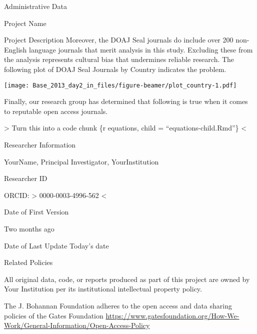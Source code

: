 \documentclass[ignorenonframetext,]{beamer}
\begin{document}
\begin{frame}{Administrative Data}
\begin{block}{Project Name}
\begin{block}{Project Description}
Moreover, the DOAJ Seal journals do include over 200 non-English
language journals that merit analysis in this study. Excluding these
from the analysis represents cultural bias that undermines reliable
research. The following plot of DOAJ Seal Journals by Country indicates
the problem.

\texttt{[image: Base\_2013\_day2\_in\_files/figure-beamer/plot\_country-1.pdf]}

Finally, our research group has determined that following is true when
it comes to reputable open access journals.

\textbar{}\textbar{}\textgreater{} Turn this into a code chunk \{r
equations, child = ``equations-child.Rmd''\}
\textless{}\textbar{}\textbar{}

\end{block}

\begin{block}{Researcher Information}

YourName, Principal Investigator, YourInstitution

Researcher ID

ORCID: \textbar{}\textbar{}\textgreater{} 0000-0003-4996-562
\textless{}\textbar{}\textbar{}

Date of First Version

Two months ago

Date of Last Update Today's date

Related Policies

All original data, code, or reports produced as part of this project are
owned by Your Institution per its institutional intellectual property
policy.

The J. Bohannan Foundation adheres to the open access and data sharing
policies of the Gates Foundation
\url{https://www.gatesfoundation.org/How-We-Work/General-Information/Open-Access-Policy}

\end{block}

\end{block}

\end{frame}
\end{document}
